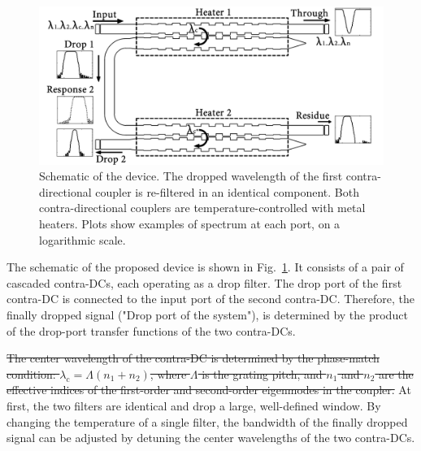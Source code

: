 \documentclass[9pt,twocolumn,twoside]{osajnl}
\begin{document}
	\begin{figure}[htbp]
		\centering
		\includegraphics[width=1.00\columnwidth]{data/CascadedSchematic2}
		\centering
		\caption{Schematic of the device. 
			The dropped wavelength of the first contra-directional coupler is re-filtered in an identical component. 
			Both contra-directional couplers are temperature-controlled with metal heaters. 
			Plots show examples of spectrum at each port, on a logarithmic scale.}
		\label{fig:schematic}
	\end{figure}
	
	The schematic of the proposed device is shown in Fig.~\ref{fig:schematic}. 
	It consists of a pair of cascaded contra-DCs, each operating as a drop filter. 
	The drop port of the first contra-DC is connected to the input port of the second contra-DC. 
	Therefore, the finally dropped signal ("Drop port of the system"), is determined by the product of the  drop-port transfer functions of the two contra-DCs. 
	
	\sout{The center wavelength of the contra-DC is determined by the phase-match condition: $\lambda_\text{c} = \Lambda (n_\text{1}+n_\text{2})$, where $\Lambda$ is the grating pitch, and $n_\text{1}$ and $n_\text{2}$ are the effective indices of the first-order and second-order eigenmodes in the coupler.}
	At first, the two filters are identical and drop a large, well-defined window. By changing the temperature of a single filter, the bandwidth of the finally dropped signal can be adjusted by detuning the center wavelengths of the two contra-DCs.
	
	
	
\end{document}
